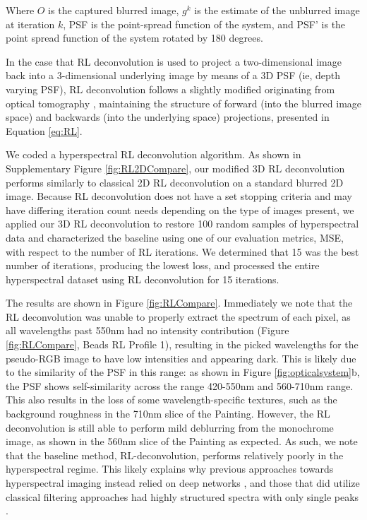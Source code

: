 \documentclass{article}
\begin{document}
Where $O$ is the captured blurred image, $g^{k}$ is the estimate of the unblurred image at iteration $k$, PSF is the point-spread function of the system, and PSF' is the point spread function of the system rotated by 180 degrees. 

In the case that RL deconvolution is used to project a two-dimensional image back into a 3-dimensional underlying image by means of a 3D PSF (ie, depth varying PSF), RL deconvolution follows a slightly modified originating from optical tomography \cite{broxton2013wave}\cite{guo2019fourier}, maintaining the structure of forward (into the blurred image space) and backwards (into the underlying space) projections, presented in Equation \ref{eq:RL}.

We coded a hyperspectral RL deconvolution algorithm. As shown in Supplementary Figure \ref{fig:RL2DCompare}, our modified 3D RL deconvolution performs similarly to classical 2D RL deconvolution on a standard blurred 2D image. Because RL deconvolution does not have a set stopping criteria and may have differing iteration count needs depending on the type of images present, we applied our 3D RL deconvolution to restore 100 random samples of hyperspectral data and characterized the baseline using one of our evaluation metrics, MSE, with respect to the number of RL iterations. We determined that 15 was the best number of iterations, producing the lowest loss, and processed the entire hyperspectral dataset using RL deconvolution for 15 iterations.

The results are shown in Figure \ref{fig:RLCompare}. Immediately we note that the RL deconvolution was unable to properly extract the spectrum of each pixel, as all wavelengths past 550nm had no intensity contribution (Figure \ref{fig:RLCompare}, Beads RL Profile 1), resulting in the picked wavelengths for the pseudo-RGB image to have low intensities and appearing dark. This is likely due to the similarity of the PSF in this range: as shown in Figure \ref{fig:opticalsystem}b, the PSF shows self-similarity across the range 420-550nm and 560-710nm range. This also results in the loss of some wavelength-specific textures, such as the background roughness in the 710nm slice of the Painting. However, the RL deconvolution is still able to perform mild deblurring from the monochrome image, as shown in the 560nm slice of the Painting as expected. As such, we note that the baseline method, RL-deconvolution, performs relatively poorly in the hyperspectral regime. This likely explains why previous approaches towards hyperspectral imaging instead relied on deep networks \cite{jeon2019compact}, and those that did utilize classical filtering approaches had highly structured spectra with only single peaks \cite{zhan2019hyperspectral}.
\end{document}
